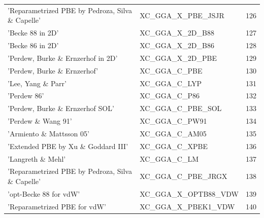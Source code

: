 \documentclass[final,12pt,makeidx,DIV=calc]{article}
\begin{document}
{{{\begin{table}[!h]
\begin{center}
\begin{tabular}{llr}
  'Reparametrized PBE by Pedroza, Silva \& Capelle' & XC\_GGA\_X\_PBE\_JSJR  &126\\
  'Becke 88 in 2D' & XC\_GGA\_X\_2D\_B88  &127\\
  'Becke 86 in 2D' & XC\_GGA\_X\_2D\_B86  &128\\
  'Perdew, Burke \& Ernzerhof in 2D' & XC\_GGA\_X\_2D\_PBE  &129\\
  'Perdew, Burke \& Ernzerhof' & XC\_GGA\_C\_PBE  &130\\
  'Lee, Yang \& Parr' & XC\_GGA\_C\_LYP  &131\\
  'Perdew 86' & XC\_GGA\_C\_P86  &132\\
  'Perdew, Burke \& Ernzerhof SOL' & XC\_GGA\_C\_PBE\_SOL  &133\\
  'Perdew \& Wang 91' & XC\_GGA\_C\_PW91  &134\\
  'Armiento \& Mattsson 05' & XC\_GGA\_C\_AM05  &135\\
  'Extended PBE by Xu \& Goddard III' & XC\_GGA\_C\_XPBE  &136\\
  'Langreth \& Mehl' & XC\_GGA\_C\_LM  &137\\
  'Reparametrized PBE by Pedroza, Silva \& Capelle' & XC\_GGA\_C\_PBE\_JRGX  &138\\
  'opt-Becke 88 for vdW' & XC\_GGA\_X\_OPTB88\_VDW  &139\\
  'Reparametrized PBE for vdW' & XC\_GGA\_X\_PBEK1\_VDW  &140\\
\hline
\hline
\end{tabular}
\end{center}
\end{table}

}}}
\end{document}
